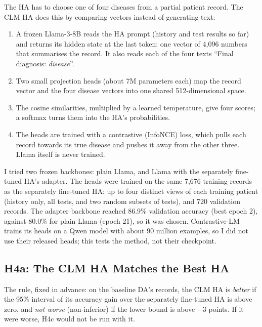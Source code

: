 \documentclass[11pt]{article}
\begin{document}
The HA has to choose one of four diseases from a partial patient record. The
CLM HA does this by comparing vectors instead of generating text:

\begin{enumerate}
  \item A frozen Llama-3-8B reads the HA prompt (history and test results so
        far) and returns its hidden state at the last token: one vector of
        4,096 numbers that summarises the record. It also reads each of the four
        texts ``Final diagnosis: \emph{disease}''.
  \item Two small projection heads (about 7M parameters each) map the record
        vector and the four disease vectors into one shared 512-dimensional
        space.
  \item The cosine similarities, multiplied by a learned temperature, give four
        scores; a softmax turns them into the HA's probabilities.
  \item The heads are trained with a contrastive (InfoNCE) loss, which pulls
        each record towards its true disease and pushes it away from the other
        three. Llama itself is never trained.
\end{enumerate}

I tried two frozen backbones: plain Llama, and Llama with the separately
fine-tuned HA's adapter. The heads were trained on the same 7,676 training
records as the separately fine-tuned HA: up to four distinct views of each
training patient (history only, all tests, and two random subsets of tests),
and 720 validation records. The
adapter backbone reached 86.9\% validation accuracy (best epoch 2), against
80.0\% for plain Llama (epoch 21), so it was chosen. Contrastive-LM trains its
heads on a Qwen model with about 90 million examples, so I did not use their
released heads; this tests the method, not their checkpoint.

\subsection*{H4a: The CLM HA Matches the Best HA}

The rule, fixed in advance: on the baseline DA's records, the CLM HA is
\emph{better} if the 95\% interval of its accuracy gain over the separately
fine-tuned HA is above zero, and \emph{not worse} (non-inferior) if the lower
bound is above $-$3 points. If it were worse, H4c would not be run with it.
\end{document}
